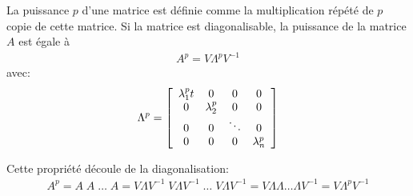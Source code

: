 La puissance $p$ d'une matrice est définie comme la multiplication répété de $p$ copie de cette matrice. Si la matrice est diagonalisable, la puissance de la matrice $A$ est égale à
\begin{align}
A^p = V \Lambda^p V^{-1}
\label{eq:matrixpower}
\end{align}
avec:
\begin{align}
\Lambda^p = 
\left[ \begin{array}{c c c c}  
\lambda_1^p t &  0          & 0 & 0 \\
0         &  \lambda_2^p  & 0      & 0 \\
0         &  0          &\ddots  & 0 \\
0         &  0          & 0  & \lambda_n^p
\end{array} \right]
\end{align}

Cette propriété découle de la diagonalisation:
\begin{align}
A^p = A \; A \; \hdots \; A = V \Lambda V^{-1} \; V \Lambda V^{-1} \;  \hdots \; V \Lambda V^{-1} = V \Lambda \Lambda   \hdots \Lambda V^{-1} = V \Lambda^p V^{-1}
\end{align}

